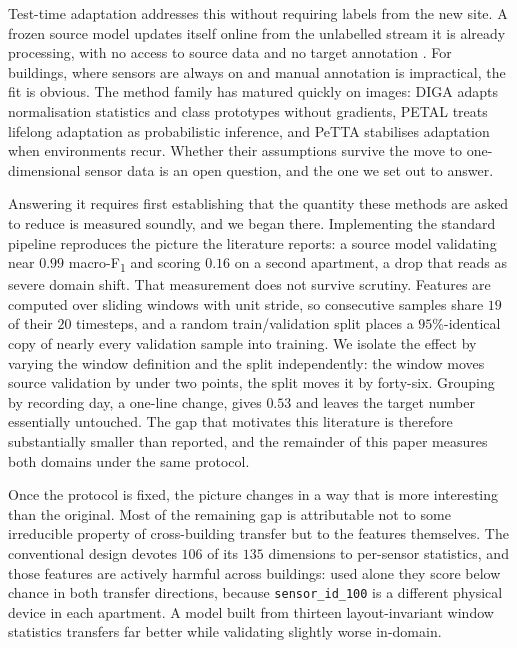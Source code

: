 \documentclass[a4paper,fleqn]{cas-dc}
\newcommand{\macf}{macro-F\textsubscript{1}}
\begin{document}
Test-time adaptation addresses this without requiring labels from the new site. A frozen
source model updates itself online from the unlabelled stream it is already processing,
with no access to source data and no target annotation \cite{liang2024}. For buildings,
where sensors are always on and manual annotation is impractical, the fit is obvious. The
method family has matured quickly on images: DIGA \cite{diga} adapts normalisation
statistics and class prototypes without gradients, PETAL \cite{petal} treats lifelong
adaptation as probabilistic inference, and PeTTA \cite{petta} stabilises adaptation when
environments recur. Whether their assumptions survive the move to one-dimensional sensor
data is an open question, and the one we set out to answer.

Answering it requires first establishing that the quantity these methods are asked to
reduce is measured soundly, and we began there. Implementing the standard pipeline
reproduces the picture the literature reports: a source model validating near $0.99$
\macf{} and scoring $0.16$ on a second apartment, a drop that reads as severe domain
shift. That measurement does not survive scrutiny. Features are computed over sliding
windows with unit stride, so consecutive samples share $19$ of their $20$ timesteps, and a
random train/validation split places a $95\%$-identical copy of nearly every validation
sample into training. We isolate the effect by varying the window definition and the split
independently: the window moves source validation by under two points, the split moves it
by forty-six. Grouping by recording day, a one-line change, gives $0.53$ and leaves
the target number essentially untouched. The gap that motivates this literature is
therefore substantially smaller than reported, and the remainder of this paper measures
both domains under the same protocol.

Once the protocol is fixed, the picture changes in a way that is more interesting than
the original. Most of the remaining gap is attributable not to some irreducible property
of cross-building transfer but to the features themselves. The conventional design devotes
$106$ of its $135$ dimensions to per-sensor statistics, and those features are actively
harmful across buildings: used alone they score below chance in both transfer directions,
because \texttt{sensor\_id\_100} is a different physical device in each apartment. A model
built from thirteen layout-invariant window statistics transfers far better while
validating slightly worse in-domain.
\end{document}
